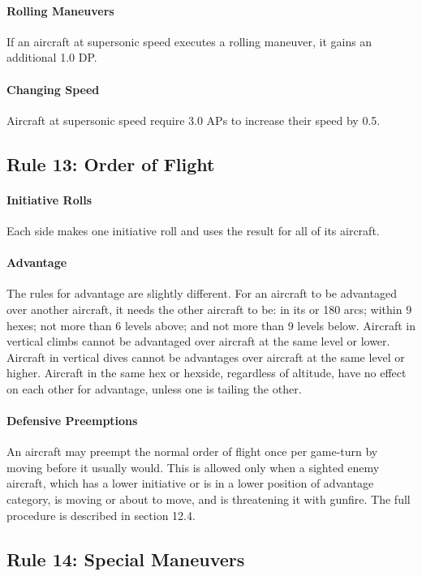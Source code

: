 \documentclass[10pt]{article}
\begin{document}
\paragraph{Rolling Maneuvers} If an aircraft at supersonic speed executes a rolling maneuver, it gains an additional 1.0 DP.

\paragraph{Changing Speed} Aircraft at supersonic speed require 3.0 APs to increase their speed by 0.5.

\subsection{Rule 13: Order of Flight}

\paragraph{Initiative Rolls} Each side makes one initiative roll and uses the result for all of its aircraft.

\paragraph{Advantage} The rules for advantage are slightly different. For an aircraft to be advantaged over another aircraft, it needs the other aircraft to be: in its  or {180\deg} arcs; within 9 hexes; not more than 6 levels above; and not more than 9 levels below. Aircraft in vertical climbs cannot be advantaged over aircraft at the same level or lower. Aircraft in vertical dives cannot be advantages over aircraft at the same level or higher. Aircraft in the same hex or hexside, regardless of altitude, have no effect on each other for advantage, unless one is tailing the other.

\paragraph{Defensive Preemptions} An aircraft may preempt the normal order of flight once per game-turn by moving before it usually would. This is allowed only when a sighted enemy aircraft, which has a lower initiative or is in a lower position of advantage category, is moving or about to move, and is threatening it with gunfire. The full procedure is described in section 12.4.

\subsection{Rule 14: Special Maneuvers}
\end{document}
